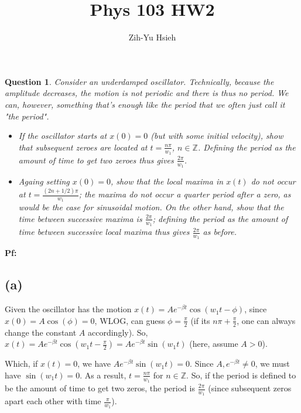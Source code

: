 \documentclass{article}
\title{Phys 103 HW2}
\author{Zih-Yu Hsieh}
\newtheorem{question}{Question}
\newcommand{\ZZ}{\mathbb{Z}}
\begin{document}
\maketitle

\section{}
\begin{question}\label{q1}
    Consider an underdamped oscillator. Technically, because the amplitude decreases, the motion is not periodic and there is thus no period. We can, however, something that's enough like the period that we often just call it "the period".
    \begin{itemize}
        \item[(a)] If the oscillator starts at $x(0)=0$ (but with some initial velocity), show that subsequent zeroes are located at $t=\frac{n\pi}{w_1}$, $n \in \ZZ$. Defining the period as the amount of time to get two zeroes thus gives $\frac{2\pi}{w_1}$.
        \item[(b)] Againg setting $x(0)=0$, show that the local maxima in $x(t)$ do not occur at $t=\frac{(2n+1/2)\pi}{w_1}$; the maxima do not occur a quarter period after a zero, as would be the case for sinusoidal motion. On the other hand, show that the time between successive maxima is $\frac{2\pi}{w_1}$; defining the period as the amount of time between successive local maxima thus gives $\frac{2\pi}{w_1}$ as before. 
    \end{itemize}
\end{question}

\textbf{Pf:}

\subsection*{(a)}
Given the oscillator has the motion $x(t)=Ae^{-\beta t}\cos(w_1t-\phi)$, since $x(0) = A\cos(\phi)=0$, WLOG, can guess $\phi = \frac{\pi}{2}$ (if its $n\pi +\frac{\pi}{2}$, one can always change the constant $A$ accordingly). So, $x(t)=Ae^{-\beta t}\cos(w_1 t-\frac{\pi}{2})=Ae^{-\beta t}\sin(w_1 t)$ (here, assume $A>0$).

Which, if $x(t) = 0$, we have $Ae^{-\beta t}\sin(w_1 t)=0$. Since $A, e^{-\beta t}\neq 0$, we must have $\sin(w_1 t)=0$. As a result, $t = \frac{n\pi}{w_1}$ for $n \in \ZZ$. So, if the period is defined to be the amount of time to get two zeros, the period is $\frac{2\pi}{w_1}$ (since subsequent zeros apart each other with time $\frac{\pi}{w_1}$).
\end{document}
